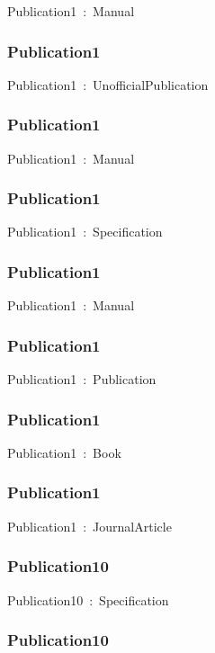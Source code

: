 \documentclass{article}
\begin{document}
Publication1~:~Manual

\subsubsection*{Publication1}

Publication1~:~UnofficialPublication

\subsubsection*{Publication1}

Publication1~:~Manual

\subsubsection*{Publication1}

Publication1~:~Specification

\subsubsection*{Publication1}

Publication1~:~Manual

\subsubsection*{Publication1}

Publication1~:~Publication

\subsubsection*{Publication1}

Publication1~:~Book

\subsubsection*{Publication1}

Publication1~:~JournalArticle

\subsubsection*{Publication10}

Publication10~:~Specification

\subsubsection*{Publication10}
\end{document}
